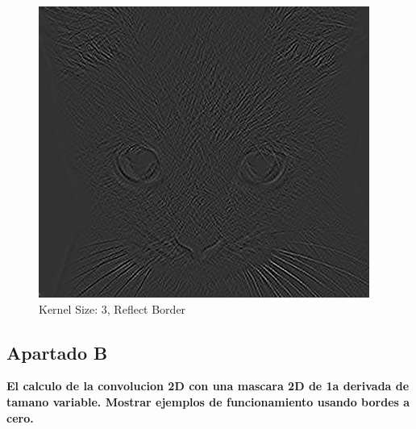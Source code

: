 \documentclass{article}
\begin{document}
\begin{minipage}{\linewidth}
    \centering
    \begin{minipage}{0.45\linewidth}
        \begin{figure}[H]
			\includegraphics[width=\linewidth]{Ejercicio2a/cat(3,3)_REFLECT.png}             			
			\caption{Kernel Size: 3,  Reflect Border}
        \end{figure}
    \end{minipage}   
\end{minipage}

\subsection*{Apartado B}
\textbf{El calculo de la convolucion 2D con una mascara 2D de 1a derivada de tamano variable. Mostrar ejemplos de funcionamiento usando bordes a cero.}
\end{document}
